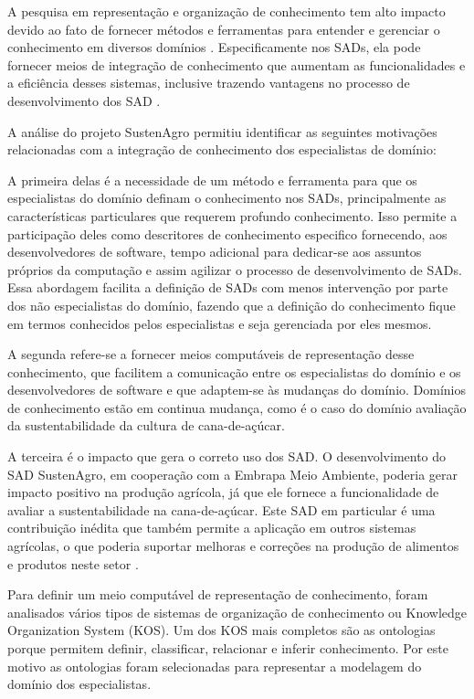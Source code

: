 A pesquisa em representação e organização de conhecimento tem alto
impacto devido ao fato de fornecer métodos e ferramentas para entender
e gerenciar o conhecimento em diversos domínios \citep{Tudhope2006}.
Especificamente nos SADs, ela pode fornecer meios de integração de
conhecimento que aumentam as funcionalidades e a eficiência desses
sistemas, inclusive trazendo vantagens no processo de desenvolvimento
dos SAD \citep{Saxena}.

A análise do projeto SustenAgro permitiu identificar as seguintes
motivações relacionadas com a integração de conhecimento dos especialistas
de domínio:

A primeira delas é a necessidade de um método e ferramenta para que
os especialistas do domínio definam o conhecimento nos SADs, principalmente
as características particulares que requerem profundo conhecimento.
Isso permite a participação deles como descritores de conhecimento
especifico fornecendo, aos desenvolvedores de software, tempo adicional
para dedicar-se aos assuntos próprios da computação e assim agilizar
o processo de desenvolvimento de SADs. Essa abordagem facilita a definição
de SADs com menos intervenção por parte dos não especialistas do domínio,
fazendo que a definição do conhecimento fique em termos conhecidos
pelos especialistas e seja gerenciada por eles mesmos. 

A segunda refere-se a fornecer meios computáveis de representação
desse conhecimento, que facilitem a comunicação entre os especialistas
do domínio e os desenvolvedores de software e que adaptem-se às mudanças
do domínio. Domínios de conhecimento estão em continua mudança, como
é o caso do domínio avaliação da sustentabilidade da cultura de cana-de-açúcar\citep{oliveira:2013}. 

A terceira é o impacto que gera o correto uso dos SAD\citep{Lee2008349}.
O desenvolvimento do SAD SustenAgro, em cooperação com a Embrapa Meio
Ambiente, poderia gerar impacto positivo na produção agrícola, já
que ele fornece a funcionalidade de avaliar a sustentabilidade na
cana-de-açúcar. Este SAD em particular é uma contribuição inédita
que também permite a aplicação em outros sistemas agrícolas, o que
poderia suportar melhoras e correções na produção de alimentos e produtos
neste setor \citep{Matthews2008149}.

Para definir um meio computável de representação de conhecimento,
foram analisados vários tipos de sistemas de organização de conhecimento
ou \foreignlanguage{english}{Knowledge Organization System} (\foreignlanguage{english}{KOS}).
Um dos \foreignlanguage{english}{KOS} mais completos são as ontologias
porque permitem definir, classificar, relacionar e inferir conhecimento.
Por este motivo as ontologias foram selecionadas para representar
a modelagem do domínio dos especialistas.

